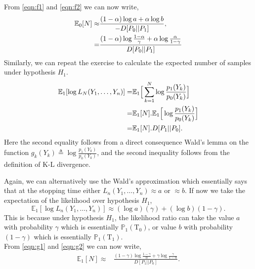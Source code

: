 \documentclass[a4paper,english,12pt]{article}
\newcommand{\Tau}{\mathrm{T}}
\begin{document}
From \eqref{eqn:f1} and \eqref{eqn:f2} we can now write,
\begin{eqnarray}
\notag\mathbb{E}_0[N] \approx & \frac{(1-\alpha)\log a + \alpha\log b}{-D[P_0||P_1]},\\
=& \frac{(1-\alpha)\log \frac{1-\alpha}{\gamma} + \alpha\log \frac{\alpha}{1-\gamma}}{D[P_0||P_1]}
\end{eqnarray}
Similarly, we can repeat the exercise to calculate the expected number of samples under hypothesis $H_1$.
\begin{eqnarray}\label{eqn:g1}
\notag\mathbb{E}_1[\log L_N(Y_1,\ldots, Y_n)] = & \mathbb{E}_1\Big[\sum_{k=1}^{N}\log \frac{p_1(Y_k)}{p_0(Y_k)}\Big]\\
\notag=& \mathbb{E}_1[N].\mathbb{E}_1\Big[\log \frac{p_1(Y_k)}{p_0(Y_k)}\Big]\\
=& \mathbb{E}_1[N].D[P_1||P_0].
\end{eqnarray}
Here the second equality follows from a direct consequence Wald's lemma on the function $g_k(Y_k)\triangleq \log\frac{p_1(Y_k)}{p_0(Y_k)}$, and the second inequality follows from the definition of K-L divergence.
\par Again, we can alternatively use the Wald's approximation which essentially says that at the stopping time either $L_n(Y_1,\ldots,Y_n) \approx a \text{ or } \approx b$. If now  we take the expectation of the likelihood over hypothesis $H_1$,
\begin{equation}\label{eqn:g2}
\mathbb{E}_1[\log L_n(Y_1,\ldots,Y_n)] \approx (\log a)(\gamma) + (\log b)(1-\gamma).
\end{equation}
This is because under hypothesis $H_1$, the likelihood ratio can take the  value $a$ with probability $\gamma$ which is essentially $\mathbb{P}_1(\Tau_0)$, or value $b$ with probability $(1-\gamma)$ which is essentially $\mathbb{P}_1(\Tau_1)$.\\
From \eqref{eqn:g1} and \eqref{eqn:g2} we can now write,
\begin{eqnarray}
\mathbb{E}_1[N] \approx & \frac{(1-\gamma)\log \frac{1-\gamma}{\alpha} + \gamma\log \frac{\gamma}{1-\alpha}}{D[P_1||P_0]}.
\end{eqnarray}
\end{document}
